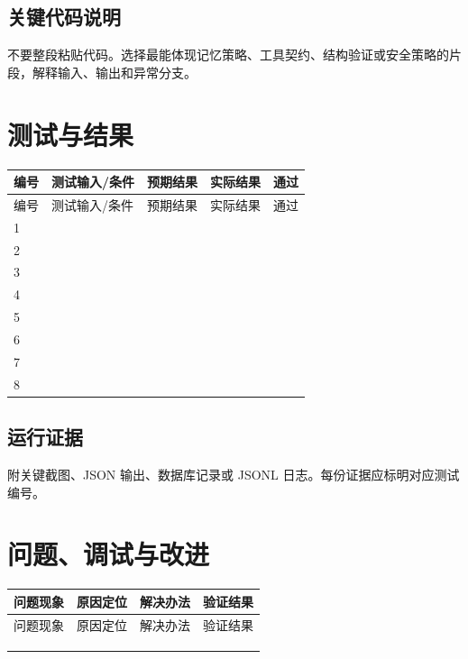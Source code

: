 \documentclass[UTF8,zihao=-4]{ctexart}
\begin{document}
\subsection{关键代码说明}

不要整段粘贴代码。选择最能体现记忆策略、工具契约、结构验证或安全策略的片段，解释输入、输出和异常分支。

\vspace{6cm}

\section{测试与结果}

\begin{longtable}{C{1.2cm} L{3.6cm} L{3.6cm} L{2.7cm} C{1.6cm}}
\toprule
编号 & 测试输入/条件 & 预期结果 & 实际结果 & 通过\\
\midrule
\endfirsthead
\toprule
编号 & 测试输入/条件 & 预期结果 & 实际结果 & 通过\\
\midrule
{} & & & &\\[1.1cm]
2 & & & &\\[1.1cm]
3 & & & &\\[1.1cm]
4 & & & &\\[1.1cm]
5 & & & &\\[1.1cm]
6 & & & &\\[1.1cm]
7 & & & &\\[1.1cm]
8 & & & &\\[1.1cm]
\bottomrule
\end{longtable}

\subsection{运行证据}

附关键截图、JSON 输出、数据库记录或 JSONL 日志。每份证据应标明对应测试编号。

\vspace{7cm}

\section{问题、调试与改进}

\begin{longtable}{L{3.0cm} L{3.4cm} L{3.4cm} L{4.8cm}}
\toprule
问题现象 & 原因定位 & 解决办法 & 验证结果\\
\midrule
\endfirsthead
\toprule
问题现象 & 原因定位 & 解决办法 & 验证结果\\
\midrule
\endhead
 & & &\\[1.4cm]
 & & &\\[1.4cm]
 & & &\\[1.4cm]
\bottomrule
\end{longtable}
\end{document}
